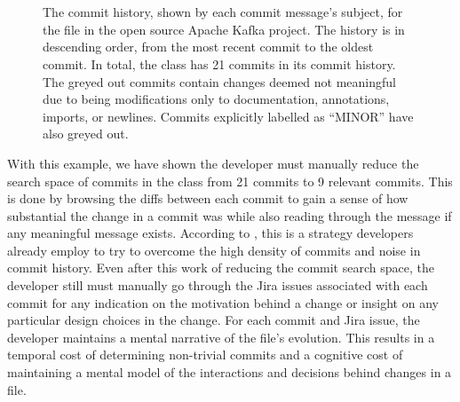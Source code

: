 \begin{figure}
\begin{flushleft}
	\textcolor{gray}{} \\
	\textcolor{gray}{} \\
	\textcolor{gray}{} \\
	 \\
	 \\
	\textcolor{gray}{} \\
	 \\
	\caption{The commit history, shown by each commit message's subject, for the  file in the open source Apache Kafka project. 		The history is in descending order, from the most recent commit to the oldest commit.
		In total, the  class has 21 commits in its commit history. The greyed out commits contain changes deemed not meaningful due 		to being modifications only to documentation, annotations, imports, or newlines. Commits explicitly labelled as ``MINOR'' have also greyed 			out.}
	\label{fig:Topology-Commit-History}
\end{flushleft}
\end{figure}

With this example, we have shown the developer must manually reduce the search space of commits in the  class from 21 commits to 9 relevant commits. 
This is done by browsing the diffs between each commit to gain a sense of how substantial the change in a commit was while also reading through the message if any meaningful message exists.
According to \cite{codoban_software_2015}, this is a strategy developers already employ to try to overcome the high density of commits and noise in commit history. 
Even after this work of reducing the commit search space, the developer still must manually go through the Jira issues associated with each commit for any indication on the motivation behind a change or insight on any particular design choices in the change.
For each commit and Jira issue, the developer maintains a mental narrative of the file's evolution. 
This results in a temporal cost of determining non-trivial commits and a cognitive cost of maintaining a mental model of the interactions and decisions behind changes in a file.

